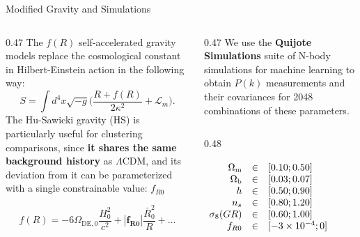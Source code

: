 \begin{block}{Modified Gravity and Simulations}
\vspace{-3ex}
  \begin{columns}[t]
    \begin{column}{0.47\linewidth}
      \justify
      The $f(R)$ self-accelerated gravity models replace the cosmological constant in Hilbert-Einstein action in the following way:\\
      \begin{equation}
  S = \int d^4x\sqrt{-g}\Big( \frac{R+f(R)}{2\kappa^2} + \mathcal{L}_m \Big)\text{.}
\end{equation}
      The Hu-Sawicki gravity (HS) is particularly useful for clustering comparisons, since \textbf{it shares the same background history} as $\Lambda$CDM, and its deviation from it can be parameterized with a single constrainable value: $f_{R0}$
      
      \begin{equation}
        f(R)=-6 \Omega_{\mathrm{DE}, 0} \frac{H_0^2}{c^2}+\left|\boldsymbol{f_{R 0}}\right| \frac{\bar{R}_0^2}{R}+\ldots
      \end{equation}
    \end{column}
    
    
    \hfill %
    
    \begin{column}{0.47\linewidth}
      \justify
      We use the \textbf{Quijote Simulations} \cite{Quijote_sims} suite of N-body simulations for machine learning to obtain $P(k)$ measurements and their covariances for 2048 combinations of these parameters.

      
      \begin{columns}[T]
        \begin{column}{0.48\linewidth}
          \vspace{0pt}
          \begin{table}
            \centering
            \renewcommand{\arraystretch}{1.2}
            $\begin{array}[t]{r c l}
              \Omega_{\mathrm{m}} & \in & [0.10; 0.50] \\
              \Omega_{\mathrm{b}} & \in & [0.03; 0.07] \\
              h & \in & [0.50; 0.90] \\
              n_s & \in & [0.80; 1.20] \\
              \sigma_8(GR) & \in & [0.60; 1.00] \\
              f_{R0} & \in & [-3 \times 10^{-4}; 0]
            \end{array}$
            \caption{Parameters for the HS simulations.}
          \end{table}
        \end{column}
        

\end{columns}
\end{column}
\end{columns}
\end{block}

